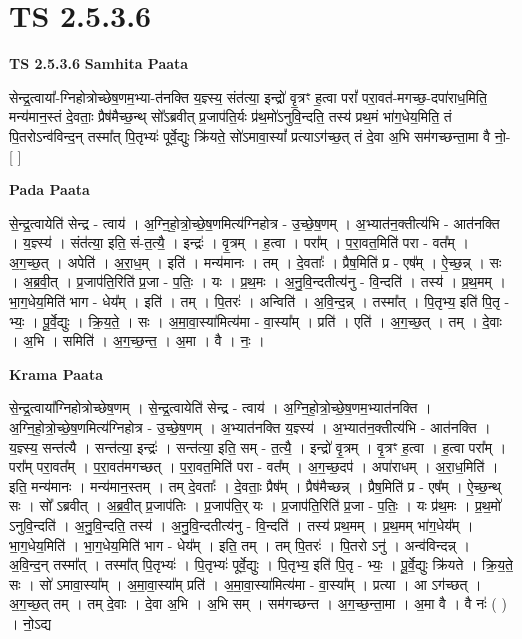 \documentclass[17pt]{extarticle}
\begin{document}
\section{ TS 2.5.3.6 }

\textbf{TS 2.5.3.6 } \newline
\textbf{Samhita Paata} \newline

सेन्द्र॒त्वाया᳚-ग्निहोत्रोच्छेष॒णम॒भ्या-त॑नक्ति य॒ज्ञ्स्य॒ संत॑त्या॒ इन्द्रो॑ वृ॒त्रꣳ ह॒त्वा परां᳚ परा॒वत॑-मगच्छ॒-दपा॑राध॒मिति॒ मन्य॑मान॒स्तं दे॒वताः॒ प्रैष॑मैच्छ॒न्थ् सो᳚ऽब्रवीत् प्र॒जाप॑ति॒र्यः प्र॑थ॒मो॑ऽनुवि॒न्दति॒ तस्य॑ प्रथ॒मं भा॑ग॒धेय॒मिति॒ तं पि॒तरोऽन्व॑विन्द॒न् तस्मा᳚त् पि॒तृभ्यः॑ पूर्वे॒द्युः क्रि॑यते॒ सो॑ऽमावा॒स्यां᳚ प्रत्याऽग॑च्छ॒त् तं दे॒वा अ॒भि सम॑गच्छन्ता॒मा वै नो॒-  [  ] \newline

\textbf{Pada Paata} \newline

से॒न्द्र॒त्वायेति॑ सेन्द्र - त्वाय॑ । अ॒ग्नि॒हो॒त्रो॒च्छे॒ष॒णमित्य॑ग्निहोत्र - उ॒च्छे॒ष॒णम् । अ॒भ्यात॑न॒क्तीत्य॑भि - आत॑नक्ति । य॒ज्ञ्स्य॑ । संत॑त्या॒ इति॒ सं-त॒त्यै॒ । इन्द्रः॑ । वृ॒त्रम् । ह॒त्वा । परा᳚म् । प॒रा॒वत॒मिति॑ परा - वत᳚म् । अ॒ग॒च्छ॒त् । अपेति॑ । अ॒रा॒ध॒म् । इति॑ । मन्य॑मानः । तम् । दे॒वताः᳚ । प्रैष॒मिति॑ प्र - एष᳚म् । ऐ॒च्छ॒न्न् । सः । अ॒ब्र॒वी॒त् । प्र॒जाप॑ति॒रिति॑ प्र॒जा - प॒तिः॒ । यः । प्र॒थ॒मः । अ॒नु॒वि॒न्दतीत्य॑नु - वि॒न्दति॑ । तस्य॑ । प्र॒थ॒मम् । भा॒ग॒धेय॒मिति॑ भाग - धेय᳚म् । इति॑ । तम् । पि॒तरः॑ । अन्विति॑ । अ॒वि॒न्द॒न्न् । तस्मा᳚त् । पि॒तृभ्य॒ इति॑ पि॒तृ - भ्यः॒ । पू॒र्वे॒द्युः । क्रि॒य॒ते॒ । सः । अ॒मा॒वा॒स्या॑मित्य॑मा - वा॒स्या᳚म् । प्रति॑ । एति॑ । अ॒ग॒च्छ॒त् । तम् । दे॒वाः । अ॒भि । समिति॑ । अ॒ग॒च्छ॒न्त॒ । अ॒मा । वै । नः॒ ।  \newline


\textbf{Krama Paata} \newline

से॒न्द्र॒त्वाया᳚ग्निहोत्रोच्छेष॒णम् । से॒न्द्र॒त्वायेति॑ सेन्द्र - त्वाय॑ । अ॒ग्नि॒हो॒त्रो॒च्छे॒ष॒णम॒भ्यात॑नक्ति । अ॒ग्नि॒हो॒त्रो॒च्छे॒ष॒णमित्य॑ग्निहोत्र - उ॒च्छे॒ष॒णम् । अ॒भ्यात॑नक्ति य॒ज्ञ्स्य॑ । अ॒भ्यात॑न॒क्तीत्य॑भि - आत॑नक्ति । य॒ज्ञ्स्य॒ सन्त॑त्यै । सन्त॑त्या॒ इन्द्रः॑ । सन्त॑त्या॒ इति॒ सम् - त॒त्यै॒ । इन्द्रो॑ वृ॒त्रम् । वृ॒त्रꣳ ह॒त्वा । ह॒त्वा परा᳚म् । परा᳚म् परा॒वत᳚म् । प॒रा॒वत॑मगच्छत् । प॒रा॒वत॒मिति॑ परा - वत᳚म् । अ॒ग॒च्छ॒दप॑ । अपा॑राधम् । अ॒रा॒ध॒मिति॑ । इति॒ मन्य॑मानः । मन्य॑मान॒स्तम् । तम् दे॒वताः᳚ । दे॒वताः॒ प्रैष᳚म् । प्रैष॑मैच्छन्न् । प्रैष॒मिति॑ प्र - एष᳚म् । ऐ॒च्छ॒न्थ् सः । सो᳚ ऽब्रवीत् । अ॒ब्र॒वी॒त् प्र॒जाप॑तिः । प्र॒जाप॑ति॒र् यः । प्र॒जाप॑ति॒रिति॑ प्र॒जा - प॒तिः॒ । यः प्र॑थ॒मः । प्र॒थ॒मो॑ ऽनुवि॒न्दति॑ । अ॒नु॒वि॒न्दति॒ तस्य॑ । अ॒नु॒वि॒न्दतीत्य॑नु - वि॒न्दति॑ । तस्य॑ प्रथ॒मम् । प्र॒थ॒मम् भा॑ग॒धेय᳚म् । भा॒ग॒धेय॒मिति॑ । भा॒ग॒धेय॒मिति॑ भाग - धेय᳚म् । इति॒ तम् । तम् पि॒तरः॑ । पि॒तरो ऽनु॑ । अन्व॑विन्दन्न् । अ॒वि॒न्द॒न् तस्मा᳚त् । तस्मा᳚त् पि॒तृभ्यः॑ । पि॒तृभ्यः॑ पूर्वे॒द्युः । पि॒तृभ्य॒ इति॑ पि॒तृ - भ्यः॒ । पू॒र्वे॒द्युः क्रि॑यते । क्रि॒य॒ते॒ सः । सो॑ ऽमावा॒स्या᳚म् । अ॒मा॒वा॒स्या᳚म् प्रति॑ । अ॒मा॒वा॒स्या॑मित्य॑मा - वा॒स्या᳚म् । प्रत्या । आ ऽग॑च्छत् । अ॒ग॒च्छ॒त् तम् । तम् दे॒वाः । दे॒वा अ॒भि । अ॒भि सम् । सम॑गच्छन्त । अ॒ग॒च्छ॒न्ता॒मा । अ॒मा वै । वै नः॑ ( ) । नो॒ऽद्य \newline
\end{document}
